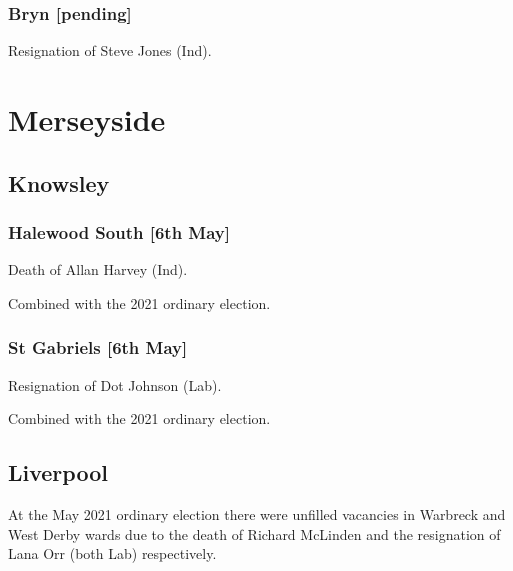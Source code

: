\documentclass[a4paper,openany]{book}
\begin{document}
\begin{resultsiii}
\subsubsection*{Bryn \hspace*{\fill}\nolinebreak[1]%
	\enspace\hspace*{\fill}
	[pending]}


Resignation of Steve Jones (Ind).

\section{Merseyside}

\subsection*{Knowsley}

\subsubsection*{Halewood South \hspace*{\fill}\nolinebreak[1]%
	\enspace\hspace*{\fill}
	[6th May]}


Death of Allan Harvey (Ind).

Combined with the 2021 ordinary election.

\subsubsection*{St Gabriels \hspace*{\fill}\nolinebreak[1]%
	\enspace\hspace*{\fill}
	[6th May]}


Resignation of Dot Johnson (Lab).

Combined with the 2021 ordinary election.

\subsection*{Liverpool}

At the May 2021 ordinary election there were unfilled vacancies in Warbreck and West Derby wards due to the death of Richard McLinden and the resignation of Lana Orr (both Lab) respectively.


\end{resultsiii}
\end{document}
